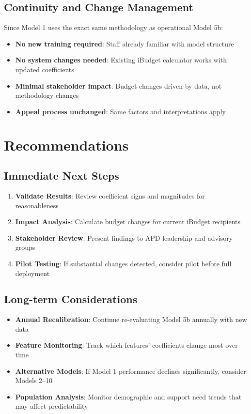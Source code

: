 \subsection{Continuity and Change Management}

Since Model 1 uses the exact same methodology as operational Model 5b:
\begin{itemize}
    \item \textbf{No new training required}: Staff already familiar with model structure
    \item \textbf{No system changes needed}: Existing iBudget calculator works with updated coefficients
    \item \textbf{Minimal stakeholder impact}: Budget changes driven by data, not methodology changes
    \item \textbf{Appeal process unchanged}: Same factors and interpretations apply
\end{itemize}

\section{Recommendations}

\subsection{Immediate Next Steps}

\begin{enumerate}
    \item \textbf{Validate Results}: Review coefficient signs and magnitudes for reasonableness
    \item \textbf{Impact Analysis}: Calculate budget changes for current iBudget recipients
    \item \textbf{Stakeholder Review}: Present findings to APD leadership and advisory groups
    \item \textbf{Pilot Testing}: If substantial changes detected, consider pilot before full deployment
\end{enumerate}

\subsection{Long-term Considerations}

\begin{itemize}
    \item \textbf{Annual Recalibration}: Continue re-evaluating Model 5b annually with new data
    \item \textbf{Feature Monitoring}: Track which features' coefficients change most over time
    \item \textbf{Alternative Models}: If Model 1 performance declines significantly, consider Models 2--10
    \item \textbf{Population Analysis}: Monitor demographic and support need trends that may affect predictability
\end{itemize}

